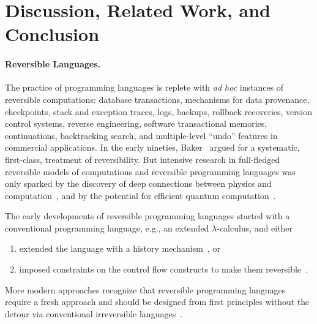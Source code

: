 \documentclass{entcs}
\begin{document}
\section{Discussion, Related Work, and Conclusion}
\label{sec:conclusion}

\paragraph*{Reversible Languages.}
\noindent The practice of programming languages is replete with \emph{ad hoc}
instances of reversible computations: database transactions, mechanisms for data
provenance, checkpoints, stack and exception traces, logs, backups, rollback
recoveries, version control systems, reverse engineering, software transactional
memories, continuations, backtracking search, and multiple-level ``undo''
features in commercial applications. In the early nineties,
Baker~\cite{Baker:1992:LLL,Baker:1992:NFT} argued for a systematic, first-class,
treatment of reversibility. But intensive research in full-fledged reversible
models of computations and reversible programming languages was only sparked by
the discovery of deep connections between physics and
computation~\cite{Landauer:1961,PhysRevA.32.3266,Toffoli:1980,bennett1985fundamental,Frank:1999:REC:930275},
and by the potential for efficient quantum
computation~\cite{springerlink:10.1007/BF02650179}.

The early developments of reversible programming languages started with a
conventional programming language, e.g., an extended $\lambda$-calculus, and either
\begin{enumerate}
\item extended the language with a history
mechanism~\cite{vanTonder:2004,Kluge:1999:SEMCD,lorenz,danos2004reversible}, or
\item imposed constraints on the control flow constructs to make them
reversible~\cite{Yokoyama:2007:RPL:1244381.1244404}.
\end{enumerate}
More modern approaches recognize that reversible programming languages require
a fresh approach and should be designed from first principles without the
detour via conventional irreversible
languages~\cite{Yokoyama:2008:PRP,Mu:2004:ILRC,abramsky2005structural,DiPierro:2006:RCL:1166042.1166047}.
\end{document}
